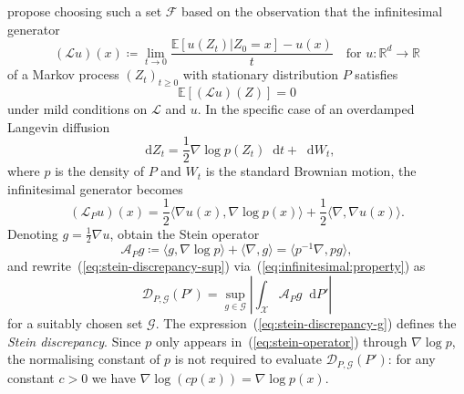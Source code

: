 \documentclass[11pt,a4paper]{report}
\newcommand*\diff{\mathop{}\!\mathrm{d}}
\begin{document}
\cite{gorhamMeasuringSampleQuality2015} propose choosing such a set $\mathcal{F}$ based on the observation that the infinitesimal generator
$$(\mathcal{L}u)(x) \coloneq \lim_{t \to 0} \frac{\mathbb{E}[u(Z_t) | Z_0 = x] - u(x)}{t} \quad \text{for } u:\mathbb{R}^d \to \mathbb{R}$$
of a Markov process $(Z_t)_{t \geq 0}$ with stationary distribution $P$ satisfies 
\begin{equation}
\mathbb{E}[(\mathcal{L} u)(Z)] = 0
\label{eq:infinitesimal:property}
\end{equation}
under mild conditions on $\mathcal{L}$ and $u$. In the specific case of an overdamped Langevin diffusion
$$\diff Z_t = \frac{1}{2} \nabla \log p(Z_t) \diff t + \diff W_t,$$
where $p$ is the density of $P$ and $W_t$ is the standard Brownian motion, the infinitesimal generator becomes
$$(\mathcal{L}_P u)(x) = \frac{1}{2} \langle \nabla u(x), \nabla \log p(x)\rangle + \frac{1}{2}\langle \nabla, \nabla u(x) \rangle.$$
Denoting $g  = \frac{1}{2}\nabla u$, \cite{gorhamMeasuringSampleQuality2015} obtain the Stein operator
\begin{equation}
\mathcal{A}_P g \coloneq \langle g, \nabla \log p \rangle + \langle \nabla, g \rangle = \langle p^{-1}\nabla, p g \rangle,
\label{eq:stein-operator}
\end{equation}
and rewrite~(\ref{eq:stein-discrepancy-sup}) via~(\ref{eq:infinitesimal:property}) as
\begin{equation}
\mathcal{D}_{P, \mathcal{G}}(P') = \sup_{g \in \mathcal{G}}\left|\int_\mathcal{X} \mathcal{A}_P g \diff P' \right|
\label{eq:stein-discrepancy-g}
\end{equation}
for a suitably chosen set $\mathcal{G}$. The expression~(\ref{eq:stein-discrepancy-g}) defines the \textit{Stein discrepancy}. Since $p$ only appears in~(\ref{eq:stein-operator}) through $\nabla \log p$, the normalising constant of $p$ is not required to evaluate $\mathcal{D}_{P, \mathcal{G}}(P')$: for any constant $c > 0$ we have $\nabla \log (c p(x)) = \nabla \log p(x)$.
\end{document}
